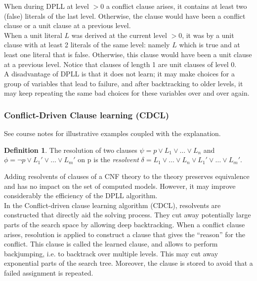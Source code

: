 \documentclass[10pt,a4paper]{article}
\theoremstyle{definition}
\newtheorem{definition}{Definition}[section]
\begin{document}
When during DPLL at level $> 0$ a conflict clause arises, it contains at least two (false) literals of the last level. Otherwise, the clause would have been a conflict clause or a unit clause at a previous level. \\

When a unit literal $L$ was derived at the current level $> 0$, it was by a unit clause with at least 2 literals of the same level: namely $L$ which is true and at least one literal that is false. Otherwise, this clause would have been a unit clause at a previous level. Notice that clauses of length 1 are unit clauses of level 0. \\

A disadvantage of DPLL is that it does not learn; it may make choices for a group of variables that lead to failure, and after backtracking to older levels, it may keep repeating the same bad choices for these variables over and over again.

\subsubsection{Conflict-Driven Clause learning (CDCL)}

See course notes for illustrative examples coupled with the explanation.

\begin{definition}
The resolution of two clauses $\psi = p \lor L_1 \lor \dots \lor L_n$ and $\phi = \lnot p \lor L_1' \lor \dots \lor L_m'$ on p is the \textit{resolvent} $\delta = L_1 \lor \dots \lor L_n \lor L_1' \lor \dots \lor L_m'$.
\end{definition}

Adding resolvents of clauses of a CNF theory to the theory preserves equivalence and has no impact on the set of computed models. However, it may improve considerably the efficiency of the DPLL algorithm.\\

In the Conflict-driven clause learning algorithm (CDCL), resolvents are constructed that directly aid the solving process. They cut away potentially large parts of the search space by allowing deep backtracking. When a conflict clause arises, resolution is applied to construct a clause that gives the “reason” for the conflict. This clause is called the learned clause, and allows to perform backjumping, i.e. to backtrack over multiple levels. This may cut away exponential parts of the search tree. Moreover, the clause is stored to avoid that a failed assignment is repeated.
\end{document}
